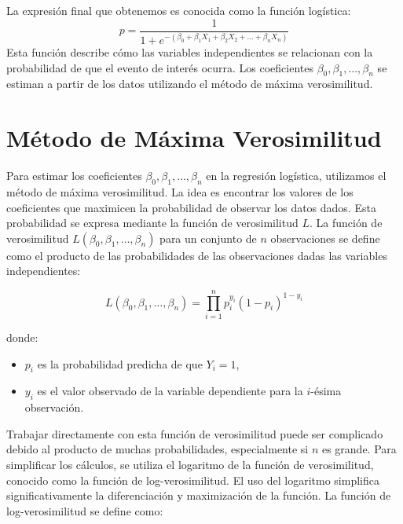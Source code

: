 
La expresión final que obtenemos es conocida como la función logística:
\begin{equation}
p = \frac{1}{1 + e^{-\left(\beta_0 + \beta_1 X_1 + \beta_2 X_2 + \ldots + \beta_n X_n\right)}}
\end{equation}
Esta función describe cómo las variables independientes se relacionan con la probabilidad de que el evento de interés ocurra. Los coeficientes $\beta_0, \beta_1, \ldots, \beta_n$ se estiman a partir de los datos utilizando el método de máxima verosimilitud.

\section{Método de Máxima Verosimilitud}

Para estimar los coeficientes $\beta_0, \beta_1, \ldots, \beta_n$ en la regresión logística, utilizamos el método de máxima verosimilitud. La idea es encontrar los valores de los coeficientes que maximicen la probabilidad de observar los datos dados. Esta probabilidad se expresa mediante la función de verosimilitud $L$. La función de verosimilitud $L(\beta_0, \beta_1, \ldots, \beta_n)$ para un conjunto de $n$ observaciones se define como el producto de las probabilidades de las observaciones dadas las variables independientes:

\begin{equation}
L(\beta_0, \beta_1, \ldots, \beta_n) = \prod_{i=1}^{n} p_i^{y_i} (1 - p_i)^{1 - y_i}
\end{equation}

donde:
\begin{itemize}
    \item $p_i$ es la probabilidad predicha de que $Y_i = 1$,
    \item $y_i$ es el valor observado de la variable dependiente para la $i$-ésima observación.
\end{itemize}


Trabajar directamente con esta función de verosimilitud puede ser complicado debido al producto de muchas probabilidades, especialmente si $n$ es grande. Para simplificar los cálculos, se utiliza el logaritmo de la función de verosimilitud, conocido como la función de log-verosimilitud. El uso del logaritmo simplifica significativamente la diferenciación y maximización de la función. La función de log-verosimilitud se define como:

